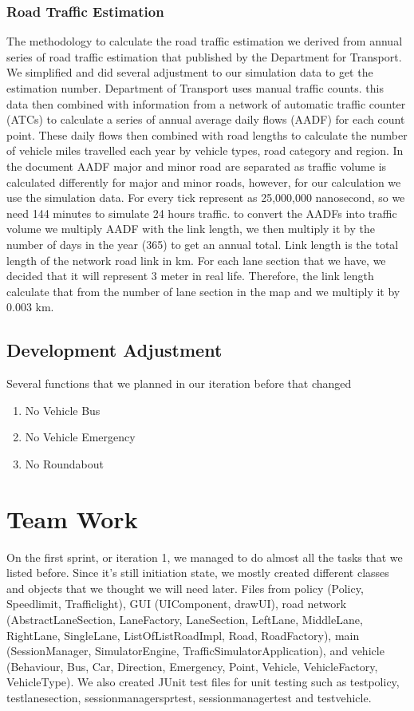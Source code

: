 \documentclass[11pt]{article}
\begin{document}
\subsubsection{Road Traffic Estimation} \label{rte}
The methodology to calculate the road traffic estimation we derived from annual series of road traffic estimation that published by the Department for Transport. We simplified and did several adjustment to our simulation data to get the estimation number. Department of Transport uses manual traffic counts. this data then combined with information from a network of automatic traffic counter (ATCs) to calculate a series of annual average daily flows (AADF) for each count point. These daily flows then combined with road lengths to calculate the number of vehicle miles travelled each year by vehicle types, road category and region. In the document AADF major and minor road are separated as traffic volume is calculated differently for major and minor roads, however, for our calculation we use the simulation data. For every tick represent as 25,000,000 nanosecond, so we need 144 minutes to simulate 24 hours traffic. 
to convert the AADFs into traffic volume we multiply AADF with the link length, we then multiply it by the number of days in the year (365) to get an annual total. Link length is the total length of the network road link in km. For each lane section that we have, we decided that it will represent 3 meter in real life. Therefore, the link length calculate that from the number of lane section in the map and we multiply it by 0.003 km. 
\subsection{Development Adjustment}
Several functions that we planned in our iteration before that changed
\begin{enumerate}[noitemsep]
	\item No Vehicle Bus 
	\item No Vehicle Emergency
	\item No Roundabout  
\end{enumerate}

\section{Team Work}
On the first sprint, or iteration 1, we managed to do almost all the tasks that we listed before. Since it's still initiation state, we mostly created different classes and objects that we thought we will need later. Files from policy (Policy, Speedlimit, Trafficlight), GUI (UIComponent, drawUI), road network (AbstractLaneSection, LaneFactory, LaneSection, LeftLane, MiddleLane, RightLane, SingleLane, ListOfListRoadImpl, Road, RoadFactory), main (SessionManager, SimulatorEngine, TrafficSimulatorApplication), and vehicle (Behaviour, Bus, Car, Direction, Emergency, Point, Vehicle, VehicleFactory, VehicleType). We also created JUnit test files for unit testing such as testpolicy, testlanesection, sessionmanagersprtest, sessionmanagertest and testvehicle. 
\end{document}
